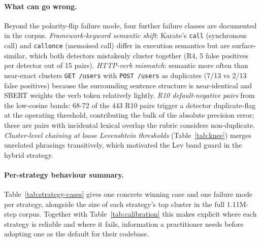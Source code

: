 \documentclass[11pt,a4paper]{article}
\begin{document}
\paragraph{What can go wrong.}
Beyond the polarity-flip failure mode, four further failure classes
are documented in the corpus. \emph{Framework-keyword semantic
shift}: Karate's \texttt{call} (synchronous call) and
\texttt{callonce} (memoised call) differ in execution semantics
but are surface-similar, which both detectors mistakenly cluster
together (R4, 5 false positives per detector out of 15 pairs).
\emph{HTTP-verb mismatch}: semantic more often than near-exact
clusters \texttt{GET /users} with \texttt{POST /users} as
duplicates (7/13 vs 2/13 false positives) because the surrounding
sentence structure is near-identical and SBERT weights the verb
token relatively lightly. \emph{R10 default-negative pairs} from
the low-cosine bands: 68-72 of the 443 R10 pairs trigger a
detector duplicate-flag at the operating threshold, contributing
the bulk of the absolute precision error; these are pairs with
incidental lexical overlap the rubric considers non-duplicate.
\emph{Cluster-level chaining at loose Levenshtein thresholds}
(Table~\ref{tab:knee}) merges unrelated phrasings transitively,
which motivated the Lev band guard in the hybrid strategy.

\paragraph{Per-strategy behaviour summary.}
Table~\ref{tab:strategy-cases} gives one concrete winning case and
one failure mode per strategy, alongside the size of each strategy's
top cluster in the full 1.11M-step corpus. Together with
Table~\ref{tab:calibration} this makes explicit where each strategy
is reliable and where it fails, information a practitioner needs
before adopting one as the default for their codebase.
\end{document}
